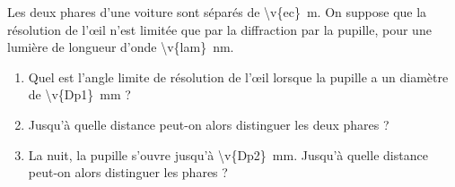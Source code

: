 Les deux phares d'une voiture sont séparés de \qty{\v{ec}}{m}. On suppose que la résolution de l'œil n'est limitée que par la diffraction par la pupille, pour une lumière de longueur d'onde \qty{\v{lam}}{nm}.

\begin{enumerate}[label=\alph*)]
    \item Quel est l'angle limite de résolution de l'œil lorsque la pupille a un diamètre de \qty{\v{Dp1}}{mm} ?
    \item Jusqu'à quelle distance peut-on alors distinguer les deux phares ?
    \item La nuit, la pupille s'ouvre jusqu'à \qty{\v{Dp2}}{mm}. Jusqu'à quelle distance peut-on alors distinguer les phares ?
\end{enumerate}

